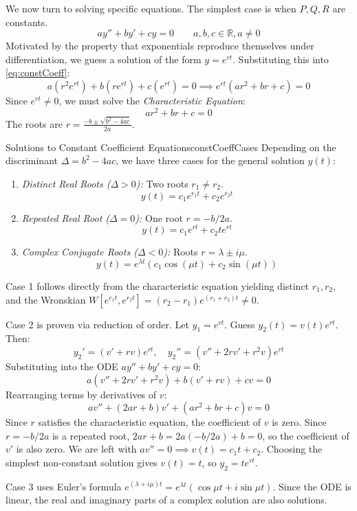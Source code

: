\documentclass{book}
\newenvironment{Proof}[1][]
  {\begin{ProofTcb}[#1]}
  {\end{ProofTcb}}
\newcommand{\R}{{\mathbb{R}}}
\begin{document}
We now turn to solving specific equations. The simplest case is when $P, Q, R$ are constants.
\begin{equation}\label{eq:constCoeff}
    ay'' + by' + cy = 0 \qquad a,b,c \in \R, a \ne 0
\end{equation}
Motivated by the property that exponentials reproduce themselves under differentiation, we guess a solution of the form $y = e^{rt}$. Substituting this into \eqref{eq:constCoeff}:
\[
    a(r^2 e^{rt}) + b(r e^{rt}) + c(e^{rt}) = 0 \implies e^{rt}(ar^2 + br + c) = 0
\]
Since $e^{rt} \ne 0$, we must solve the \emph{Characteristic Equation}:
\begin{equation}\label{eq:charEq}
    ar^2 + br + c = 0
\end{equation}
The roots are $r = \frac{-b \pm \sqrt{b^2 - 4ac}}{2a}$.

\begin{thm}{Solutions to Constant Coefficient Equations}{constCoeffCases}
    Depending on the discriminant $\Delta = b^2 - 4ac$, we have three cases for the general solution $y(t)$:
    \begin{enumerate}
        \item \emph{Distinct Real Roots ($\Delta > 0$):} Two roots $r_1 \ne r_2$.
        \[ y(t) = c_1 e^{r_1 t} + c_2 e^{r_2 t} \]
        \item \emph{Repeated Real Root ($\Delta = 0$):} One root $r = -b/2a$.
        \[ y(t) = c_1 e^{rt} + c_2 t e^{rt} \]
        \item \emph{Complex Conjugate Roots ($\Delta < 0$):} Roots $r = \lambda \pm i\mu$.
        \[ y(t) = e^{\lambda t} (c_1 \cos(\mu t) + c_2 \sin(\mu t)) \]
    \end{enumerate}
\end{thm}

\begin{Proof}
    Case 1 follows directly from the characteristic equation yielding distinct $r_1, r_2$, and the Wronskian $W[e^{r_1 t}, e^{r_2 t}] = (r_2 - r_1)e^{(r_1+r_2)t} \ne 0$.

    Case 2 is proven via reduction of order. Let $y_1 = e^{rt}$. Guess $y_2(t) = v(t)e^{rt}$. Then:
    \[
        y_2' = (v' + rv)e^{rt}, \quad y_2'' = (v'' + 2rv' + r^2v)e^{rt}
    \]
    Substituting into the ODE $ay'' + by' + cy = 0$:
    \[
        a(v'' + 2rv' + r^2v) + b(v' + rv) + cv = 0
    \]
    Rearranging terms by derivatives of $v$:
    \[
        av'' + (2ar + b)v' + (ar^2 + br + c)v = 0
    \]
    Since $r$ satisfies the characteristic equation, the coefficient of $v$ is zero. Since $r = -b/2a$ is a repeated root, $2ar + b = 2a(-b/2a) + b = 0$, so the coefficient of $v'$ is also zero. We are left with $av'' = 0 \implies v(t) = c_1 t + c_2$. Choosing the simplest non-constant solution gives $v(t) = t$, so $y_2 = te^{rt}$.

    Case 3 uses Euler's formula $e^{(\lambda+i\mu)t} = e^{\lambda t}(\cos \mu t + i \sin \mu t)$. Since the ODE is linear, the real and imaginary parts of a complex solution are also solutions.
\end{Proof}
\end{document}
